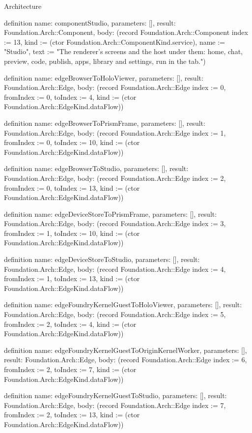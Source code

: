 \begin{lexlean}{Architecture}
\begin{semanticmodule}
definition{
  name: componentStudio,
  parameters: [],
  result: Foundation.Arch::Component,
  body: (record Foundation.Arch::Component {index := 13, kind := (ctor Foundation.Arch::ComponentKind.service), name := "Studio", text := "The renderer's screens and the host under them: home, chat, preview, code, publish, apps, library and settings, run in the tab."})
}

definition{
  name: edgeBrowserToHoloViewer,
  parameters: [],
  result: Foundation.Arch::Edge,
  body: (record Foundation.Arch::Edge {index := 0, fromIndex := 0, toIndex := 4, kind := (ctor Foundation.Arch::EdgeKind.dataFlow)})
}

definition{
  name: edgeBrowserToPrismFrame,
  parameters: [],
  result: Foundation.Arch::Edge,
  body: (record Foundation.Arch::Edge {index := 1, fromIndex := 0, toIndex := 10, kind := (ctor Foundation.Arch::EdgeKind.dataFlow)})
}

definition{
  name: edgeBrowserToStudio,
  parameters: [],
  result: Foundation.Arch::Edge,
  body: (record Foundation.Arch::Edge {index := 2, fromIndex := 0, toIndex := 13, kind := (ctor Foundation.Arch::EdgeKind.dataFlow)})
}

definition{
  name: edgeDeviceStoreToPrismFrame,
  parameters: [],
  result: Foundation.Arch::Edge,
  body: (record Foundation.Arch::Edge {index := 3, fromIndex := 1, toIndex := 10, kind := (ctor Foundation.Arch::EdgeKind.dataFlow)})
}

definition{
  name: edgeDeviceStoreToStudio,
  parameters: [],
  result: Foundation.Arch::Edge,
  body: (record Foundation.Arch::Edge {index := 4, fromIndex := 1, toIndex := 13, kind := (ctor Foundation.Arch::EdgeKind.dataFlow)})
}

definition{
  name: edgeFoundryKernelGuestToHoloViewer,
  parameters: [],
  result: Foundation.Arch::Edge,
  body: (record Foundation.Arch::Edge {index := 5, fromIndex := 2, toIndex := 4, kind := (ctor Foundation.Arch::EdgeKind.dataFlow)})
}

definition{
  name: edgeFoundryKernelGuestToOriginKernelWorker,
  parameters: [],
  result: Foundation.Arch::Edge,
  body: (record Foundation.Arch::Edge {index := 6, fromIndex := 2, toIndex := 7, kind := (ctor Foundation.Arch::EdgeKind.dataFlow)})
}

definition{
  name: edgeFoundryKernelGuestToStudio,
  parameters: [],
  result: Foundation.Arch::Edge,
  body: (record Foundation.Arch::Edge {index := 7, fromIndex := 2, toIndex := 13, kind := (ctor Foundation.Arch::EdgeKind.dataFlow)})
}


\end{semanticmodule}
\end{lexlean}
